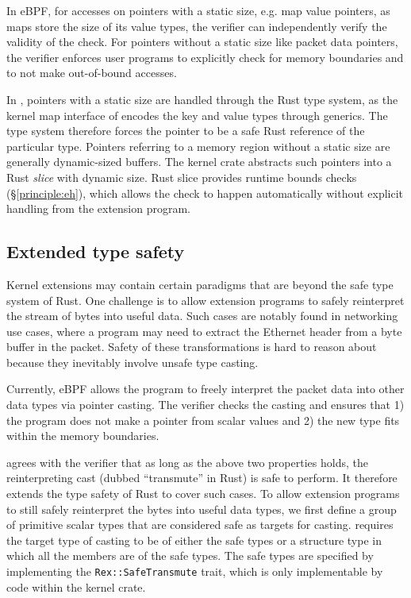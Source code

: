 In eBPF, for accesses on pointers with a static size, e.g. map value pointers,
    as maps store the size of its value types, the verifier can independently
    verify the validity of the check.
For pointers without a static size like packet data pointers, the verifier
    enforces user programs to explicitly check for memory
    boundaries and to not make out-of-bound accesses.

In \projname{}, pointers with a static size are handled through the Rust type
    system, as the
    kernel map interface of \projname{} encodes the key and value types through
    generics.
The type system therefore forces the pointer to be a safe Rust reference of
    the particular type.
Pointers referring to a memory region without a static size are generally
    dynamic-sized buffers.
The \projname{} kernel crate abstracts such pointers into a Rust \emph{slice}
    with dynamic size.
Rust slice provides runtime bounds checks (\S\ref{principle:eh}), which allows
    the check to happen automatically without explicit handling from the
    extension program.

\subsection{Extended type safety}
Kernel extensions may contain certain paradigms that are beyond the safe
    type system of Rust.
One challenge is to allow extension programs to safely reinterpret the stream
    of bytes into useful data.
Such cases are notably found in networking use cases, where a program may need
    to extract the Ethernet header from a byte buffer in the packet.
Safety of these transformations is hard to reason about because they
    inevitably involve unsafe type casting.

Currently, eBPF allows the program to freely interpret the packet data into
    other data types via pointer casting.
The verifier checks the casting and ensures that 1) the program does not make a
    pointer from scalar values and 2) the new type fits within the memory
    boundaries.

\projname{} agrees with the verifier that as long as the above two properties
    holds, the reinterpreting cast (dubbed ``transmute'' in Rust) is safe to
    perform.
It therefore extends the type safety of Rust to cover such cases.
To allow extension programs to still safely reinterpret the bytes into useful
    data types, we first define a group of primitive scalar types that are
    considered safe as targets for casting.
\projname{} requires the target type of casting to be of either the safe types
    or a structure type in which all the members are of the safe types.
The safe types are specified by implementing the \texttt{Rex::SafeTransmute}
    trait, which is only implementable by code within the kernel crate.

